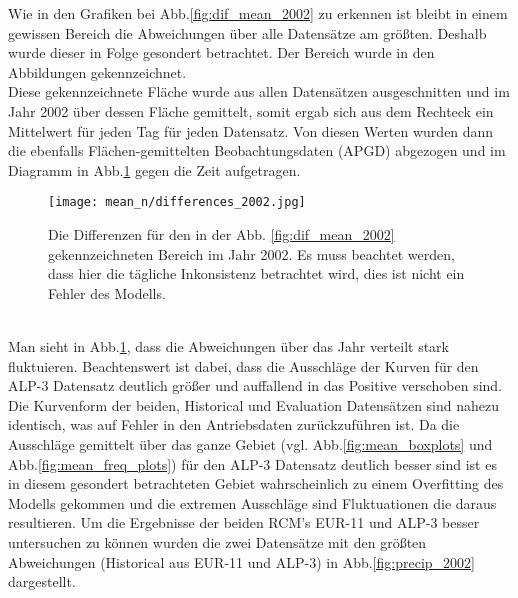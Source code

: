 Wie in den Grafiken bei Abb.\ref{fig:dif_mean_2002} zu erkennen ist bleibt in einem gewissen Bereich die Abweichungen über alle Datensätze am größten. Deshalb wurde dieser in Folge gesondert betrachtet. Der Bereich wurde in den Abbildungen gekennzeichnet.\\
Diese gekennzeichnete Fläche wurde aus allen Datensätzen ausgeschnitten und im Jahr 2002 über dessen Fläche gemittelt, somit ergab sich aus dem Rechteck ein Mittelwert für jeden Tag für jeden Datensatz. Von diesen Werten wurden dann die ebenfalls Flächen-gemittelten Beobachtungsdaten (APGD) abgezogen und im Diagramm in Abb.\ref{fig:diff_2002} gegen die Zeit aufgetragen.\\
\begin{figure}[h]
	\texttt{[image: mean\_n/differences\_2002.jpg]}
	\caption{Die Differenzen für den in der Abb. \ref{fig:dif_mean_2002} gekennzeichneten Bereich im Jahr 2002. Es muss beachtet werden, dass hier die tägliche Inkonsistenz betrachtet wird, dies ist nicht ein Fehler des Modells.}
	\label{fig:diff_2002}
\end{figure}\\
Man sieht in Abb.\ref{fig:diff_2002}, dass die Abweichungen über das Jahr verteilt stark fluktuieren. Beachtenswert ist dabei, dass die Ausschläge der Kurven für den ALP-3 Datensatz deutlich größer und auffallend in das Positive verschoben sind. Die Kurvenform der beiden, Historical und Evaluation Datensätzen sind nahezu identisch, was auf Fehler in den Antriebsdaten zurückzuführen ist. Da die Ausschläge gemittelt über das ganze Gebiet (vgl. Abb.\ref{fig:mean_boxplots} und Abb.\ref{fig:mean_freq_plots}) für den ALP-3 Datensatz deutlich besser sind ist es in diesem gesondert betrachteten Gebiet wahrscheinlich zu einem Overfitting des Modells gekommen und die extremen Ausschläge sind Fluktuationen die daraus resultieren. Um die Ergebnisse der beiden RCM's EUR-11 und ALP-3 besser untersuchen zu können wurden die zwei Datensätze mit den größten Abweichungen (Historical aus EUR-11 und ALP-3) in Abb.\ref{fig:precip_2002} dargestellt.\\

